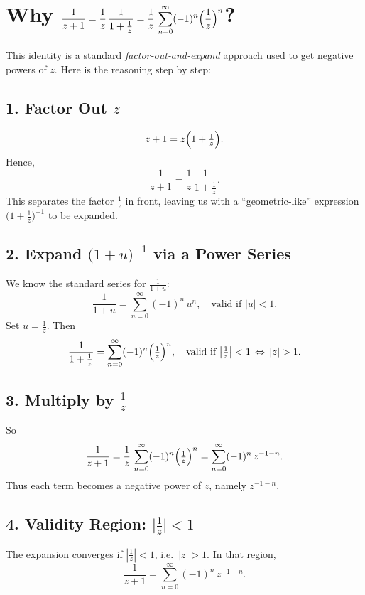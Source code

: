 \documentclass[12pt]{article}
\theoremstyle{definition} %
\theoremstyle{plain} %
\begin{document}
\section*{Why \(\displaystyle \frac{1}{z+1} = \frac{1}{z}\,\frac{1}{1+\frac{1}{z}} = \frac{1}{z}\,\sum_{n=0}^\infty(-1)^n\Bigl(\frac{1}{z}\Bigr)^n\)?}

This identity is a standard \emph{factor‐out‐and‐expand} approach used to get negative powers of \(z\). Here is the reasoning step by step:

\subsection*{1. Factor Out \(z\)}

\[
z+1 = z\Bigl(1 + \tfrac{1}{z}\Bigr).
\]
Hence,
\[
\frac{1}{z+1}
= \frac{1}{z}\,\frac{1}{1 + \frac{1}{z}}.
\]
This separates the factor \(\tfrac{1}{z}\) in front, leaving us with a “geometric‐like” expression \(\bigl(1 + \tfrac{1}{z}\bigr)^{-1}\) to be expanded.

\subsection*{2. Expand \(\bigl(1+u\bigr)^{-1}\) via a Power Series}

We know the standard series for \(\frac{1}{1+u}\):
\[
\frac{1}{1+u} 
= \sum_{n=0}^\infty (-1)^n\,u^n,
\quad \text{valid if } |u|<1.
\]
Set \(u = \tfrac{1}{z}\). Then
\[
\frac{1}{1+\frac{1}{z}}
= \sum_{n=0}^\infty (-1)^n \Bigl(\tfrac{1}{z}\Bigr)^n,
\quad \text{valid if } \bigl|\tfrac{1}{z}\bigr|<1 \,\Leftrightarrow\, |z|>1.
\]

\subsection*{3. Multiply by \(\frac{1}{z}\)}

So
\[
\frac{1}{z+1}
= \frac{1}{z}\,\sum_{n=0}^\infty (-1)^n \Bigl(\tfrac{1}{z}\Bigr)^n
= \sum_{n=0}^\infty (-1)^n\,z^{-1-n}.
\]
Thus each term becomes a negative power of \(z\), namely \(z^{-1-n}\). 

\subsection*{4. Validity Region: \(\bigl|\tfrac{1}{z}\bigr|<1\)}

The expansion converges if \(\left|\tfrac{1}{z}\right|<1\), i.e.\ \(|z|>1\). In that region, 
\[
\frac{1}{z+1} 
= \sum_{n=0}^\infty (-1)^n \, z^{-1-n}.
\]
\end{document}
